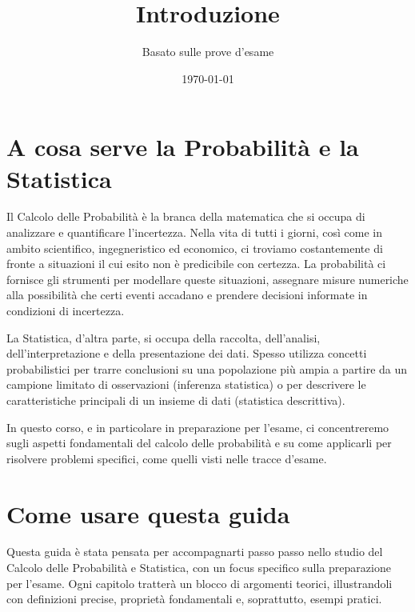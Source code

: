 

\title{Introduzione}
\author{Basato sulle prove d'esame}
\date{\today}



\maketitle
\tableofcontents
\newpage

\section{A cosa serve la Probabilità e la Statistica}
Il Calcolo delle Probabilità è la branca della matematica che si occupa di analizzare e quantificare l'incertezza. Nella vita di tutti i giorni, così come in ambito scientifico, ingegneristico ed economico, ci troviamo costantemente di fronte a situazioni il cui esito non è predicibile con certezza. La probabilità ci fornisce gli strumenti per modellare queste situazioni, assegnare misure numeriche alla possibilità che certi eventi accadano e prendere decisioni informate in condizioni di incertezza.

La Statistica, d'altra parte, si occupa della raccolta, dell'analisi, dell'interpretazione e della presentazione dei dati. Spesso utilizza concetti probabilistici per trarre conclusioni su una popolazione più ampia a partire da un campione limitato di osservazioni (inferenza statistica) o per descrivere le caratteristiche principali di un insieme di dati (statistica descrittiva).

In questo corso, e in particolare in preparazione per l'esame, ci concentreremo sugli aspetti fondamentali del calcolo delle probabilità e su come applicarli per risolvere problemi specifici, come quelli visti nelle tracce d'esame.

\section{Come usare questa guida}
Questa guida è stata pensata per accompagnarti passo passo nello studio del Calcolo delle Probabilità e Statistica, con un focus specifico sulla preparazione per l'esame. Ogni capitolo tratterà un blocco di argomenti teorici, illustrandoli con definizioni precise, proprietà fondamentali e, soprattutto, esempi pratici.

